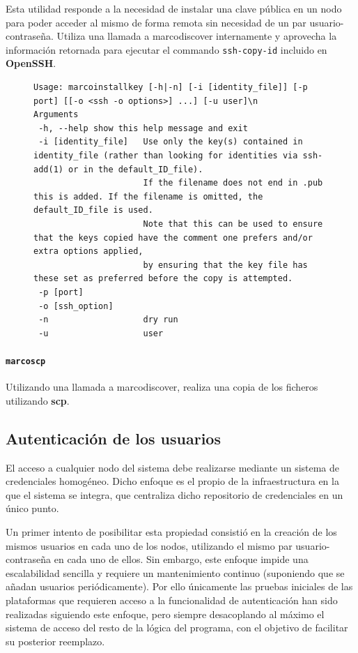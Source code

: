 Esta utilidad responde a la necesidad de instalar una clave pública en un nodo para poder acceder al mismo de forma remota sin necesidad de un par usuario-contraseña. Utiliza una llamada a marcodiscover internamente y aprovecha la información retornada para ejecutar el commando \texttt{ssh-copy-id} incluido en \textbf{OpenSSH}.

\begin{figure}[H]
\begin{lstlisting}
Usage: marcoinstallkey [-h|-n] [-i [identity_file]] [-p port] [[-o <ssh -o options>] ...] [-u user]\n
Arguments
 -h, --help	show this help message and exit
 -i [identity_file]   Use only the key(s) contained in identity_file (rather than looking for identities via ssh-add(1) or in the default_ID_file).
                      If the filename does not end in .pub this is added. If the filename is omitted, the default_ID_file is used.
                      Note that this can be used to ensure that the keys copied have the comment one prefers and/or extra options applied,
                      by ensuring that the key file has these set as preferred before the copy is attempted.
 -p [port]
 -o [ssh_option]
 -n                   dry run
 -u                   user

\end{lstlisting}
\end{figure}

\paragraph{\texttt{marcoscp}}

Utilizando una llamada a marcodiscover, realiza una copia de los ficheros utilizando \textbf{scp}.


\subsection{Autenticación de los usuarios}

El acceso a cualquier nodo del sistema debe realizarse mediante un sistema de credenciales homogéneo. Dicho enfoque es el propio de la infraestructura en la que el sistema se integra, que centraliza dicho repositorio de credenciales en un único punto.

Un primer intento de posibilitar esta propiedad consistió en la creación de los mismos usuarios en cada uno de los nodos, utilizando el mismo par usuario-contraseña en cada uno de ellos. Sin embargo, este enfoque impide una escalabilidad sencilla y requiere un mantenimiento continuo (suponiendo que se añadan usuarios periódicamente). Por ello únicamente las pruebas iniciales de las plataformas que requieren acceso a la funcionalidad de autenticación han sido realizadas siguiendo este enfoque, pero siempre desacoplando al máximo el sistema de acceso del resto de la lógica del programa, con el objetivo de facilitar su posterior reemplazo.

